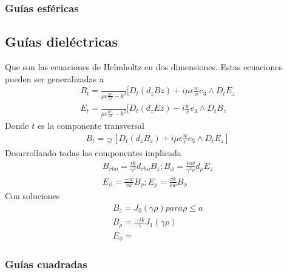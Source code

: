 \subsubsection{Guías esféricas}

\subsection{Guías dieléctricas}
Que son las ecuaciones de Helmholtz en dos dimensiones. Estas ecuaciones pueden ser generalizadas a
\begin{subequations}
	\begin{align}
	B_{t}=\frac{}{\mu \epsilon\frac{w^2}{c^2}-k^2}[D_{t} (d_{z} B{z})+i\mu\epsilon\frac{w}{v}e_{3}\wedge D_{t}E_{z} \\
	E_{t}=\frac{}{\mu \epsilon\frac{w^2}{c^2}-k^2}[D_{t} (d_{z} E{z})-i\frac{w}{v}e_{3}\wedge D_{t}B_{z} 
	\end{align}
	\end{subequations}
Donde $t$ es la componente transversal
\begin{subequations}
	\begin{align}
	B_{t}=\frac{}{\gamma^2} [D_{t}(d_{z}B_{z})+i\mu \epsilon \frac{w}{v} e_{3}\wedge D_{t}E_{z}]
	\end{align}
\end{subequations}
Desarrollando todas las componentes implicada
\begin{subequations}
	\begin{align}
B_{rho} = \frac{ik}{\gamma^2}d_{rho}B_{z} ; B_{\phi} = \frac{i \epsilon w}{\gamma^2 v} d_{\rho} E_{z}\\
E_{\phi} = \frac{-w}{v k }B_{\rho} ; E_{\rho} = \frac{v k}{\epsilon w} B_{\phi}
	\end{align}
\end{subequations}
Con soluciones 
\begin{subequations}
	\begin{gather}
		B_{z} = J_{0}(\gamma \rho) para \rho \leq a \nonumber \\
		B_{\rho } = \frac{-i k}{\gamma} J_{1} (\gamma \rho) \nonumber \\
		E_{\phi} =
	\end{gather}
\end{subequations}
\subsubsection{Guías cuadradas}
